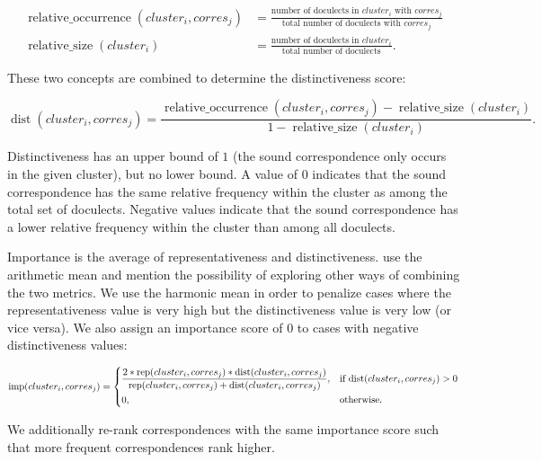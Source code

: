 \documentclass[a4paper]{article}
\begin{document}
\begin{align*}
\operatorname{relative\_occurrence}(cluster_i, corres_j) &= 
\frac{\text{number of doculects in } cluster_i \text{ with }  corres_j}
{\text{total number of doculects with } corres_j}\\
\operatorname{relative\_size}(cluster_i) &= 
\frac{\text{number of doculects in } cluster_i}
{\text{total number of doculects}}
.
\end{align*}

These two concepts are combined to determine the distinctiveness score:

\begin{equation*}
\operatorname{dist}(cluster_i, corres_j) = 
\frac{\operatorname{relative\_occurrence}(cluster_i, corres_j) - \operatorname{relative\_size}(cluster_i)}
{1 - \operatorname{relative\_size}(cluster_i)}
.
\end{equation*}

Distinctiveness has an upper bound of
$1$ (the sound correspondence only occurs in the given cluster),
but no lower bound.
A value of $0$ indicates that the sound correspondence
has the same relative frequency within the cluster
as among the total set of doculects.
Negative values indicate that the sound correspondence
has a lower relative frequency within the cluster
than among all doculects.

Importance is the average of representativeness and distinctiveness.
\citet{wieling2011bipartite} use the arithmetic mean
and mention the possibility of exploring
other ways of combining the two metrics.
We use the harmonic mean in order to penalize cases
where the representativeness value is very high
but the distinctiveness value is very low (or vice versa).
We also assign an importance score of $0$ to
cases with negative distinctiveness values:

\begin{equation*}
\operatorname{imp}(cluster_i, corres_j) = 
\begin{dcases}
\frac{
2 * \operatorname{rep}(cluster_i, corres_j) * \operatorname{dist}(cluster_i, corres_j)}
{\operatorname{rep}(cluster_i, corres_j) + \operatorname{dist}(cluster_i, corres_j)}, & \text{if dist}(cluster_i, corres_j) > 0\\
0, & \text{otherwise}.
\end{dcases}
\end{equation*}

We additionally re-rank correspondences
with the same importance score
such that more frequent correspondences rank higher.
\end{document}
